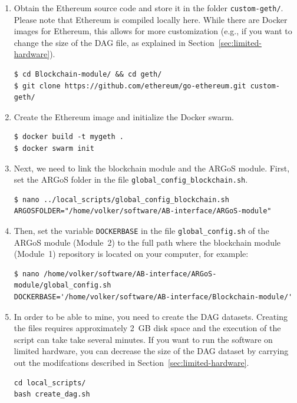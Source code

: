 \documentclass{article}
\begin{document}
\begin{enumerate}
\item Obtain the Ethereum source code and store it in the folder
\verb|custom-geth/|. Please note that Ethereum is compiled locally
here. While there are Docker images for Ethereum, this allows for more
customization (e.g., if you want to change the size of the DAG file,
as explained in Section~\ref{sec:limited-hardware}).

\begin{verbatim}
$ cd Blockchain-module/ && cd geth/
$ git clone https://github.com/ethereum/go-ethereum.git custom-geth/
\end{verbatim}
\item Create the Ethereum image and initialize the Docker swarm.

\begin{verbatim}
$ docker build -t mygeth .
$ docker swarm init
\end{verbatim}
\item Next, we need to link the blockchain module and the ARGoS module. First, set the ARGoS folder in the file \verb|global_config_blockchain.sh|.

\begin{verbatim}
$ nano ../local_scripts/global_config_blockchain.sh
ARGOSFOLDER="/home/volker/software/AB-interface/ARGoS-module"
\end{verbatim}

\item Then, set the variable \verb|DOCKERBASE| in the file
  \verb|global_config.sh| of the ARGoS module (Module~2) to the full
  path where the blockchain module (Module~1) repository is located on
  your computer, for example:

\begin{verbatim}
$ nano /home/volker/software/AB-interface/ARGoS-module/global_config.sh
DOCKERBASE='/home/volker/software/AB-interface/Blockchain-module/'
\end{verbatim}

\item In order to be able to mine, you need to create the DAG
  datasets. Creating the files requires approximately 2~GB disk space
  and the execution of the script can take take several minutes. If
  you want to run the software on limited hardware, you can decrease
  the size of the DAG dataset by carrying out the modifcations
  described in Section~\ref{sec:limited-hardware}.

\begin{verbatim}
cd local_scripts/
bash create_dag.sh
\end{verbatim}  
  
\end{enumerate}
\end{document}
